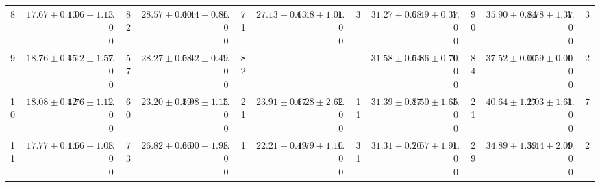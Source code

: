 \begin{table}[htbp]
\begin{tabular}{lcccccccccccccccccccc}
8 & $17.67\pm0.43$ & $1.06\pm1.13$ & 1.00 & 82 & $28.57\pm0.40$ & $0.44\pm0.86$ & 1.00 & 71 & $27.13\pm0.63$ & $1.48\pm1.01$ & 1.00 & 3 & $31.27\pm0.58$ & $0.49\pm0.37$ & 1.00 & 90 & $35.90\pm0.84$ & $1.78\pm1.37$ & 1.00 & 3 \\
9 & $18.76\pm0.45$ & $1.12\pm1.57$ & 1.00 & 57 & $28.27\pm0.58$ & $0.42\pm0.49$ & 1.00 & 82 & \multicolumn{4}{c}{--} & $31.58\pm0.54$ & $0.86\pm0.70$ & 1.00 & 84 & $37.52\pm0.00$ & $1.59\pm0.00$ & 1.00 & 2 \\
10 & $18.08\pm0.42$ & $1.76\pm1.12$ & 1.00 & 60 & $23.20\pm0.59$ & $1.98\pm1.15$ & 1.00 & 21 & $23.91\pm0.67$ & $1.28\pm2.62$ & 1.00 & 11 & $31.39\pm0.87$ & $1.50\pm1.65$ & 1.00 & 21 & $40.64\pm1.17$ & $2.03\pm1.61$ & 1.00 & 7 \\
11 & $17.77\pm0.44$ & $1.66\pm1.08$ & 1.00 & 73 & $26.82\pm0.66$ & $3.00\pm1.98$ & 1.00 & 1 & $22.21\pm0.49$ & $1.79\pm1.10$ & 1.00 & 31 & $31.31\pm0.70$ & $2.67\pm1.91$ & 1.00 & 29 & $34.89\pm1.59$ & $3.44\pm2.09$ & 1.00 & 2 \\
\bottomrule
\end{tabular}
\end{table}